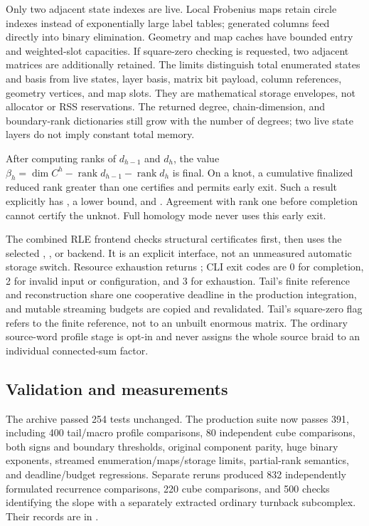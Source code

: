 Only two adjacent state indexes are live. Local Frobenius maps retain circle
indexes instead of exponentially large label tables; generated columns feed
directly into binary elimination. Geometry and map caches have bounded entry
and weighted-slot capacities. If square-zero checking is requested, two
adjacent matrices are additionally retained. The limits distinguish total
enumerated states and basis from live states, layer basis, matrix bit payload,
column references, geometry vertices, and map slots. They are mathematical
storage envelopes, not allocator or RSS reservations. The returned degree,
chain-dimension, and boundary-rank dictionaries still grow with the number
of degrees; two live state layers do not imply constant total memory.

After computing ranks of $d_{h-1}$ and $d_h$, the value
$\beta_h=\dim C^h-\operatorname{rank}d_{h-1}-\operatorname{rank}d_h$
is final. On a knot, a cumulative finalized reduced rank greater than one
certifies  and permits early exit. Such a result explicitly
has , a lower bound, and
. Agreement with rank one before completion
cannot certify the unknot. Full homology mode never uses this early exit.

The combined RLE frontend checks structural certificates first, then uses
the selected , , or  backend. It is
an explicit interface, not an unmeasured automatic storage switch. Resource
exhaustion returns ; CLI exit codes are 0 for completion, 2
for invalid input or configuration, and 3 for exhaustion. Tail's finite
reference and reconstruction share one cooperative deadline in the production
integration, and mutable streaming budgets are copied and revalidated.
Tail's square-zero flag refers to the finite reference, not to an unbuilt
enormous matrix. The ordinary source-word profile stage is opt-in and never
assigns the whole source braid to an individual connected-sum factor.

\subsection{Validation and measurements}
The archive passed 254 tests unchanged. The production suite now passes 391,
including 400 tail/macro profile comparisons, 80 independent cube comparisons,
both signs and boundary thresholds, original component parity, huge binary
exponents, streamed enumeration/maps/storage limits, partial-rank semantics,
and deadline/budget regressions. Separate reruns produced 832 independently
formulated recurrence comparisons, 220 cube comparisons, and 500 checks
identifying the slope with a separately extracted ordinary turnback
subcomplex. Their records are in .

